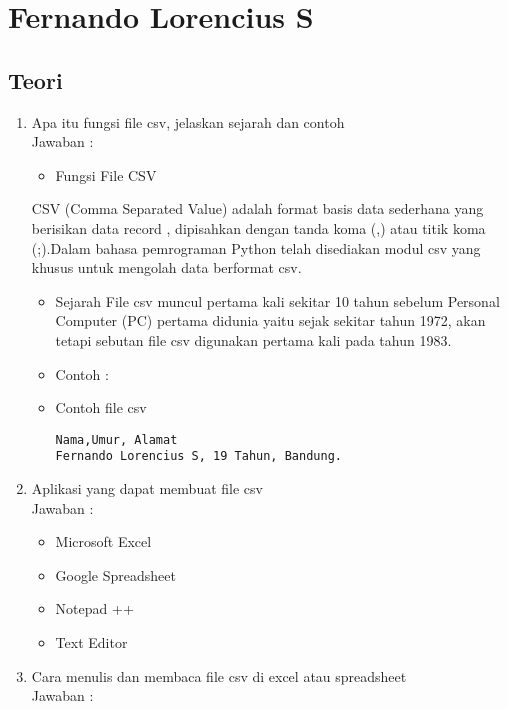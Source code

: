 \section{Fernando Lorencius S}
\subsection{Teori}
\begin{enumerate}

\item Apa itu fungsi file csv, jelaskan sejarah dan contoh\\
Jawaban :

\begin{itemize}
\item Fungsi File CSV
\end{itemize}

CSV (Comma Separated Value) adalah format basis data sederhana yang berisikan data record , dipisahkan dengan tanda koma (,) atau titik koma (;).Dalam bahasa pemrograman Python telah disediakan modul  csv  yang khusus untuk mengolah data berformat csv.

\begin{itemize}
\item Sejarah 
File csv muncul pertama kali sekitar 10 tahun sebelum Personal Computer (PC) pertama  didunia yaitu sejak sekitar tahun 1972, akan tetapi sebutan file csv digunakan pertama kali pada tahun 1983.
					\item Contoh : 
\end{itemize}

\begin{itemize}
\item Contoh file csv
\begin{verbatim}
Nama,Umur, Alamat
Fernando Lorencius S, 19 Tahun, Bandung.
\end{verbatim}
\end{itemize}

\item Aplikasi yang dapat membuat file csv\\
Jawaban :

\begin{itemize}
\item Microsoft Excel
\item Google Spreadsheet
\item Notepad ++
\item Text Editor
\end{itemize}

\item  Cara menulis dan membaca file csv di excel atau spreadsheet\\
Jawaban :


\end{enumerate}
